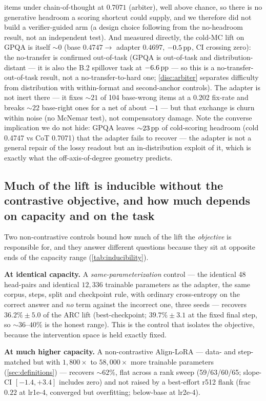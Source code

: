 items under chain-of-thought at $0.7071$ (arbiter), well above chance, so there is
no generative headroom a scoring shortcut could supply, and we therefore did not
build a verifier-guided arm (a design choice following from the no-headroom result,
not an independent test). And measured directly, the cold-MC lift on GPQA is itself
${\sim}0$ (base $0.4747 \rightarrow$ adapter $0.4697$, $-0.5\,\mathrm{pp}$, CI crossing zero):
the no-transfer is confirmed out-of-task (GPQA is out-of-task and
distribution-distant --- it is also the B.2 spillover task at $-6.6\,\mathrm{pp}$ --- so this
is a no-transfer-out-of-task result, not a no-transfer-to-hard one;
\cref{disc:arbiter} separates difficulty from distribution with within-format and
second-anchor controls). The adapter is not inert there --- it fixes ${\sim}21$ of
104 base-wrong items at a 0.202 fix-rate and breaks ${\sim}22$ base-right ones for a
net of about $-1$ --- but that exchange is churn within noise (no McNemar test), not
compensatory damage. Note the converse implication we do not hide: GPQA leaves
${\sim}23\,\mathrm{pp}$ of cold-scoring headroom (cold 0.4747 vs CoT 0.7071) that the adapter
fails to recover --- the adapter is not a general repair of the lossy readout but an
in-distribution exploit of it, which is exactly what the off-axis-of-degree geometry
predicts.

\subsection{Much of the lift is inducible without the contrastive objective, and how
much depends on capacity and on the task}\label{results:generic}

Two non-contrastive controls bound how much of the lift the \emph{objective} is
responsible for, and they answer different questions because they sit at opposite
ends of the capacity range (\cref{tab:inducibility}).

\textbf{At identical capacity.} A \emph{same-parameterization} control --- the
identical 48 head-pairs and identical $12{,}336$ trainable parameters as the adapter,
the same corpus, steps, split and checkpoint rule, with ordinary cross-entropy on the
correct answer and \emph{no} term against the incorrect one, three seeds --- recovers
$\mathbf{36.2\% \pm 5.0}$ of the ARC lift (best-checkpoint; $39.7\% \pm 3.1$ at the
fixed final step, so ${\sim}36$--$40\%$ is the honest range). This is the control that
isolates the objective, because the intervention space is held exactly fixed.

\textbf{At much higher capacity.} A non-contrastive Align-LoRA --- data- and
step-matched but with $1{,}800\times$ to $58{,}000\times$ more trainable parameters
(\cref{sec:definitions}) --- recovers ${\sim}62\%$, flat across a rank sweep
(59/63/60/65; slope-CI $[-1.4, +3.4]$ includes zero) and not raised by a best-effort
r512 flank (frac $0.22$ at lr1e-4, converged but overfitting; below-base at lr2e-4).

